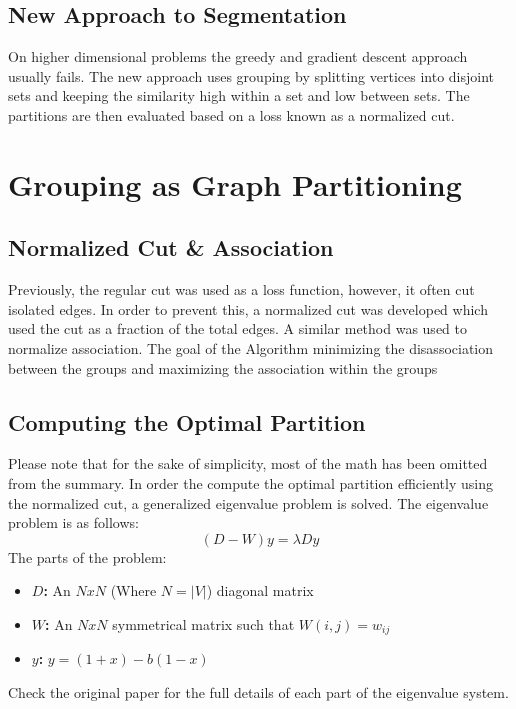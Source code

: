 \documentclass[letterpaper, 10 pt, conference]{ieeeconf}  %
\begin{document}
\subsection{New Approach to Segmentation}
On higher dimensional problems the greedy and gradient descent approach usually fails. The new approach uses grouping by splitting vertices into disjoint sets and keeping the similarity high within a set and low between sets. The partitions are then evaluated based on a loss known as a normalized cut.

\section{Grouping as Graph Partitioning}
\subsection{Normalized Cut \& Association}
Previously, the regular cut was used as a loss function, however, it often cut isolated edges. In order to prevent this, a normalized cut was developed which used the cut as a fraction of the total edges. A similar method was used to normalize association.
\smallbreak
The goal of the Algorithm minimizing the disassociation between the groups and maximizing the association within the groups
\subsection{Computing the Optimal Partition}
Please note that for the sake of simplicity, most of the math has been omitted from the summary.
In order the compute the optimal partition efficiently using the normalized cut, a generalized eigenvalue problem is solved. The eigenvalue problem is as follows:
\begin{equation}
    (D-W)y = \lambda Dy
\end{equation}
The parts of the problem:
\begin{itemize}

\item \textbf{$D$:} An $N x N$ (Where $N = |V|$) diagonal matrix 
\item \textbf{$W$:} An $N x N$ symmetrical matrix such that $W(i,j) = w_{ij}$
\item \textbf{$y$:} $y = (1 + x) - b(1-x)$
\end{itemize}
\smallbreak
Check the original paper for the full details of each part of the eigenvalue system.
\end{document}
